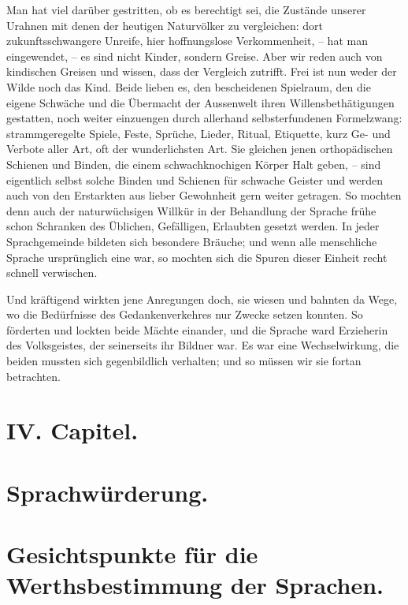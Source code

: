 \label{fp.371}

Man hat viel darüber gestritten, ob es berechtigt sei, die Zustände unserer Urahnen mit denen der heutigen  Naturvölker zu vergleichen: dort zukunftsschwangere Unreife, hier hoffnungslose Verkommenheit, – hat man eingewendet, – es sind nicht Kinder, sondern Greise. Aber wir reden auch von kindischen Greisen und wissen, dass der Vergleich zutrifft. Frei ist nun weder der Wilde noch das Kind. Beide lieben es, den bescheidenen Spielraum, den die eigene Schwäche und die Übermacht der Aussenwelt ihren Willensbethätigungen gestatten, noch weiter einzuengen durch allerhand selbsterfundenen Formelzwang: strammgeregelte Spiele, Feste, Sprüche, Lieder, Ritual, Etiquette, kurz Ge- und Verbote aller Art, oft der wunderlichsten Art. Sie gleichen jenen orthopädischen Schienen und Binden, die einem schwachknochigen Körper Halt geben, – sind eigentlich selbst solche Binden und Schienen für schwache Geister und werden auch von den Erstarkten aus lieber Gewohnheit gern weiter getragen. So mochten denn auch der naturwüchsigen Willkür in der Behandlung der Sprache frühe schon Schranken des Üblichen, Gefälligen, Erlaubten gesetzt werden. In jeder Sprachgemeinde bildeten sich besondere Bräuche; und wenn alle menschliche Sprache ursprünglich eine war, so mochten sich die Spuren dieser Einheit recht schnell verwischen.

Und kräftigend wirkten jene Anregungen doch, sie wiesen und bahnten da Wege, wo die Bedürfnisse des Gedankenverkehres nur Zwecke setzen konnten. So förderten und lockten beide Mächte einander, und die Sprache ward Erzieherin des Volksgeistes, der seinerseits ihr Bildner war. Es war eine Wechselwirkung, die beiden mussten sich gegenbildlich  verhalten; und so müssen wir sie fortan betrachten.

\clearpage{}
\section*{IV. Capitel.}\label{IV.IV}
\section*{Sprachwürderung.}\label{IV.IV.1}
\section*{Gesichtspunkte für die Werthsbestimmung der Sprachen.}

